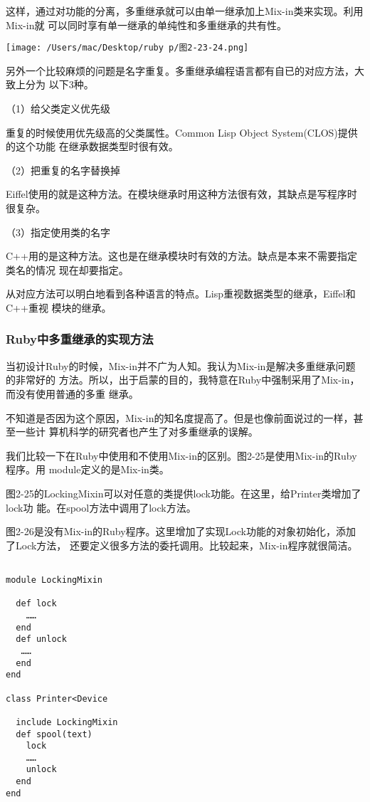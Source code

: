 \documentclass[11pt]{ctexart}
\begin{document}
这样，通过对功能的分离，多重继承就可以由单一继承加上Mix-in类来实现。利用Mix-in就
可以同时享有单一继承的单纯性和多重继承的共有性。

\begin{center}
\texttt{[image: /Users/mac/Desktop/ruby p/图2-23-24.png]}
\end{center}

另外一个比较麻烦的问题是名字重复。多重继承编程语言都有自已的对应方法，大致上分为
以下3种。

（1）给父类定义优先级

重复的时候使用优先级高的父类属性。Common Lisp Object System(CLOS)提供的这个功能
在继承数据类型时很有效。

（2）把重复的名字替换掉

Eiffel使用的就是这种方法。在模块继承时用这种方法很有效，其缺点是写程序时很复杂。

（3）指定使用类的名字

C++用的是这种方法。这也是在继承模块时有效的方法。缺点是本来不需要指定类名的情况
现在却要指定。

从对应方法可以明白地看到各种语言的特点。Lisp重视数据类型的继承，Eiffel和C++重视
模块的继承。
\subsubsection{Ruby中多重继承的实现方法}
\label{sec:orga4b0eef}

当初设计Ruby的时候，Mix-in并不广为人知。我认为Mix-in是解决多重继承问题的非常好的
方法。所以，出于启蒙的目的，我特意在Ruby中强制采用了Mix-in，而没有使用普通的多重
继承。

不知道是否因为这个原因，Mix-in的知名度提高了。但是也像前面说过的一样，甚至一些计
算机科学的研究者也产生了对多重继承的误解。

我们比较一下在Ruby中使用和不使用Mix-in的区别。图2-25是使用Mix-in的Ruby程序。用
module定义的是Mix-in类。

图2-25的LockingMixin可以对任意的类提供lock功能。在这里，给Printer类增加了lock功
能。在spool方法中调用了lock方法。

图2-26是没有Mix-in的Ruby程序。这里增加了实现Lock功能的对象初始化，添加了Lock方法，
还要定义很多方法的委托调用。比较起来，Mix-in程序就很简洁。

\lstset{language=org,label= ,caption= ,captionpos=b,numbers=none}
\begin{lstlisting}

module LockingMixin

  def lock
    ……
  end
  def unlock
   ……
  end
end

class Printer<Device

  include LockingMixin
  def spool(text)
    lock
    ……
    unlock
  end
end
\end{lstlisting}
\end{document}
